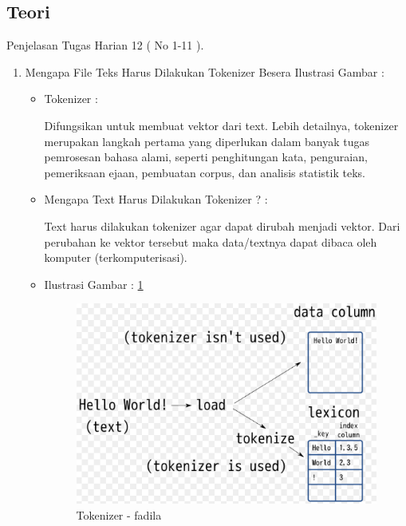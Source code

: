 \subsection{Teori}
Penjelasan Tugas Harian 12 ( No 1-11 ).
\begin{enumerate}
\item Mengapa File Teks Harus Dilakukan Tokenizer Besera Ilustrasi Gambar :
\begin{itemize}
\item Tokenizer :
\par Difungsikan untuk membuat vektor dari text. Lebih detailnya, tokenizer merupakan langkah pertama yang diperlukan dalam banyak tugas pemrosesan bahasa alami, seperti penghitungan kata, penguraian, pemeriksaan ejaan, pembuatan corpus, dan analisis statistik teks.
\par
\par
\item Mengapa Text Harus Dilakukan Tokenizer ? :
\par Text harus dilakukan tokenizer agar dapat dirubah menjadi vektor. Dari perubahan ke vektor tersebut maka data/textnya dapat dibaca oleh komputer (terkomputerisasi).
\par
\par
\item Ilustrasi Gambar : \ref{chapter-7-tokenizer-fadila}
\par
\begin{figure}[!hbtp]
\centering
\includegraphics[scale=0.2]{figures/chapter-7-tokenizer-fadila.png}
\caption{Tokenizer - fadila}
\label{chapter-7-tokenizer-fadila}
\end{figure}
\par
\end{itemize}

\end{enumerate}
